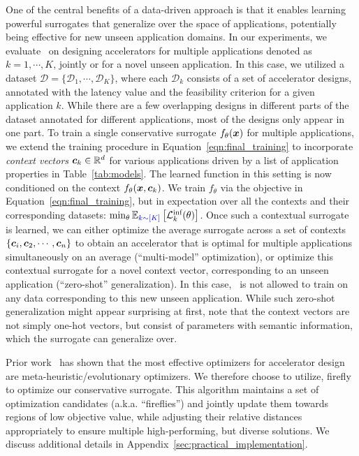 %
One of the central benefits of a data-driven approach is that it enables learning powerful surrogates that generalize over the space of applications, potentially being effective for new unseen application domains. In our experiments, we evaluate \primemethodname\ on designing accelerators for multiple applications denoted as $k=1, \cdots, K$, jointly or for a novel unseen application. In this case, we utilized a dataset $\mathcal{D} = \{\mathcal{D}_1, \cdots, \mathcal{D}_K\}$, where each $\mathcal{D}_k$ consists of a set of accelerator designs, annotated with the latency value and the feasibility criterion for a given application $k$. While there are a few overlapping designs in different parts of the dataset annotated for different applications, most of the designs only appear in one part. To train a single conservative surrogate $f_\theta({\boldsymbol{x}})$ for multiple applications, we extend the training procedure in Equation~\ref{eqn:final_training} to incorporate \textit{context vectors} ${\boldsymbol{c}}_k \in \mathbb{R}^d$ for various applications driven by a list of application properties in Table~\ref{tab:models}. The learned function in this setting is now conditioned on the context $f_\theta({\boldsymbol{x}}, {\boldsymbol{c}}_k)$. We train $f_\theta$ via the objective in Equation~\ref{eqn:final_training}, but in expectation over all the contexts and their corresponding datasets: $\min_\theta \mathbb{E}_{\textcolor{blue}{k \sim [K]}}\left[\mathcal{L}^\text{inf}_k(\theta)\right]$. Once such a contextual surrogate is learned, we can either optimize the average surrogate across a set of contexts $\{{\boldsymbol{c}}_i, {\boldsymbol{c}}_2, \cdots, {\boldsymbol{c}}_n\}$ to obtain an accelerator that is optimal for multiple applications simultaneously on an average (``multi-model'' optimization), or optimize this contextual surrogate for a novel context vector, corresponding to an unseen application (``zero-shot'' generalization). In this case, \primemethodname\ is not allowed to train on any data corresponding to this new unseen application.  While such zero-shot generalization might appear surprising at first, note that the context vectors are not simply one-hot vectors, but consist of parameters with semantic information, which the surrogate can generalize over.

 Prior work~\citep{yazdanbakhsh2021apollo} has shown that the most effective optimizers for accelerator design are meta-heuristic/evolutionary optimizers. We therefore choose to utilize, firefly~\citep{yang2010nature,yang2010eagle,liu2013adaptive} to optimize our conservative surrogate. This algorithm maintains a set of optimization candidates (a.k.a. ``fireflies'') and jointly update them towards regions of low objective value, while adjusting their relative distances appropriately to ensure multiple high-performing, but diverse solutions. We discuss additional details in Appendix~\ref{sec:practical_implementation}.


